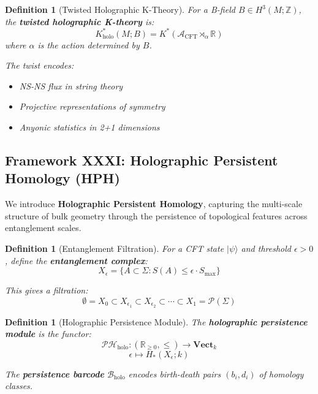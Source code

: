 \documentclass[12pt,a4paper]{article}
\newtheorem{definition}[theorem]{Definition}
\begin{document}
\begin{definition}[Twisted Holographic K-Theory]\label{def:twisted-holo-k}
For a B-field $B \in H^3(M; \mathbb{Z})$, the \textbf{twisted holographic K-theory} is:
\begin{equation}
K_{\text{holo}}^*(M; B) = K^*(\mathcal{A}_{\text{CFT}} \rtimes_\alpha \mathbb{R})
\end{equation}
where $\alpha$ is the action determined by $B$.

The twist encodes:
\begin{itemize}
    \item NS-NS flux in string theory
    \item Projective representations of symmetry
    \item Anyonic statistics in 2+1 dimensions
\end{itemize}
\end{definition}

\subsection{Framework XXXI: Holographic Persistent Homology (HPH)}
\label{subsec:holographic-persistent-homology}

We introduce \textbf{Holographic Persistent Homology}, capturing the multi-scale structure of bulk geometry through the persistence of topological features across entanglement scales.

\begin{definition}[Entanglement Filtration]\label{def:ent-filtration}
For a CFT state $|\psi\rangle$ and threshold $\epsilon > 0$, define the \textbf{entanglement complex}:
\begin{equation}
X_\epsilon = \{ A \subset \Sigma : S(A) \leq \epsilon \cdot S_{\max} \}
\end{equation}

This gives a filtration:
\begin{equation}
\emptyset = X_0 \subset X_{\epsilon_1} \subset X_{\epsilon_2} \subset \cdots \subset X_1 = \mathcal{P}(\Sigma)
\end{equation}
\end{definition}

\begin{definition}[Holographic Persistence Module]\label{def:holo-persistence}
The \textbf{holographic persistence module} is the functor:
\begin{equation}
\mathcal{PH}_{\text{holo}}: (\mathbb{R}_{\geq 0}, \leq) \to \mathbf{Vect}_k
\end{equation}
\begin{equation}
\epsilon \mapsto H_*(X_\epsilon; k)
\end{equation}

The \textbf{persistence barcode} $\mathcal{B}_{\text{holo}}$ encodes birth-death pairs $(b_i, d_i)$ of homology classes.
\end{definition}
\end{document}
